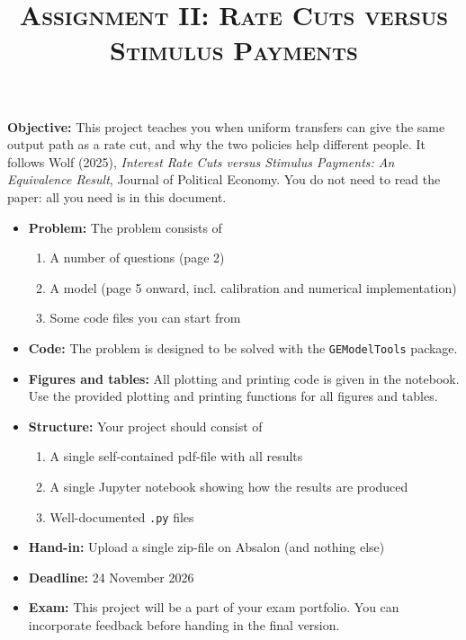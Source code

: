 \documentclass[12pt]{article}
\date{}
\author{}
\begin{document}
\title{\textsc{Assignment II: Rate Cuts versus Stimulus Payments}}
\maketitle
\vspace{-3mm}\thispagestyle{empty}

\textbf{Objective:} This project teaches you when uniform transfers can give the same output path as a rate cut, and why the two policies help different people. It follows Wolf (2025), \emph{Interest Rate Cuts versus Stimulus Payments: An Equivalence Result}, Journal of Political Economy. You do not need to read the paper: all you need is in this document.
\begin{itemize}
\item \textbf{Problem:} The problem consists of
\begin{enumerate}
\item A number of questions (page 2)
\item A model (page 5 onward, incl. calibration and numerical implementation)
\item Some code files you can start from
\end{enumerate}
\item \textbf{Code:} The problem is designed to be solved with the \texttt{GEModelTools} package.
\item \textbf{Figures and tables:} All plotting and printing code is given in the notebook. Use the provided plotting and printing functions for all figures and tables.
\item \textbf{Structure:} Your project should consist of
\begin{enumerate}
\item A single self-contained pdf-file with all results
\item A single Jupyter notebook showing how the results are produced
\item Well-documented \texttt{.py} files
\end{enumerate}
\item \textbf{Hand-in:} Upload a single zip-file on Absalon (and nothing else)
\item \textbf{Deadline:} 24 November 2026
\item \textbf{Exam:} This project will be a part of your exam portfolio.
You can incorporate feedback before handing in the final version.
\end{itemize}

\newpage



\newpage


\end{document}
